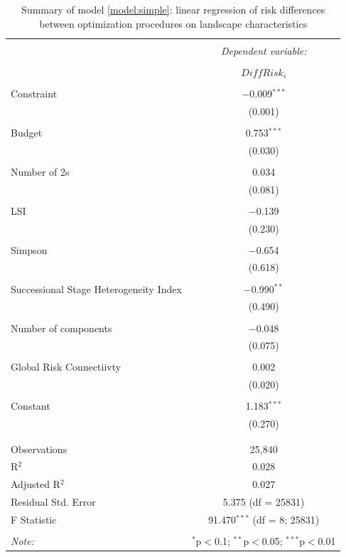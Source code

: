 \begin{table}[!htbp] \centering 
  \caption{Summary of model \ref{model:simple}: linear regression of risk differences between optimization procedures on landscape characteristics} 
  \label{tab:lm_risk} 
\begin{tabular}{@{\extracolsep{5pt}}lc} 
\\[-1.8ex]\hline 
\hline \\[-1.8ex] 
 & \multicolumn{1}{c}{\textit{Dependent variable:} } \\ 
\cline{2-2} 
\\[-1.8ex] & $DiffRisk_i$\\ 
\hline \\[-1.8ex] 
 Constraint & $-$0.009$^{***}$ \\ 
  & (0.001) \\ 
  & \\ 
 Budget & 0.753$^{***}$ \\ 
  & (0.030) \\ 
  & \\ 
 Number of 2s & 0.034 \\ 
  & (0.081) \\ 
  & \\ 
 LSI & $-$0.139 \\ 
  & (0.230) \\ 
  & \\ 
 Simpson & $-$0.654 \\ 
  & (0.618) \\ 
  & \\ 
 Successional Stage Heterogeneity Index & $-$0.990$^{**}$ \\ 
  & (0.490) \\ 
  & \\ 
 Number of components & $-$0.048 \\ 
  & (0.075) \\ 
  & \\ 
 Global Risk Connectiivty & 0.002 \\ 
  & (0.020) \\ 
  & \\ 
 Constant & 1.183$^{***}$ \\ 
  & (0.270) \\ 
  & \\ 
\hline \\[-1.8ex] 
Observations & 25,840 \\ 
R$^{2}$ & 0.028 \\ 
Adjusted R$^{2}$ & 0.027 \\ 
Residual Std. Error & 5.375 (df = 25831) \\ 
F Statistic & 91.470$^{***}$ (df = 8; 25831) \\ 
\hline 
\hline \\[-1.8ex] 
\textit{Note:}  & \multicolumn{1}{r}{$^{*}$p$<$0.1; $^{**}$p$<$0.05; $^{***}$p$<$0.01} \\ 
\end{tabular} 
\end{table} 



